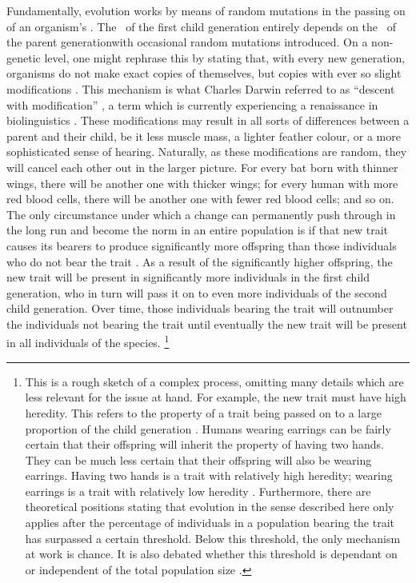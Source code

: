 Fundamentally, evolution works by means of random mutations in the passing on of an organism's \dna.
The \dna\ of the first child generation entirely depends on the \dna\ of the parent generation\dash with occasional random mutations introduced.
On a non-genetic level, one might rephrase this by stating that, with every new generation, organisms do not make exact copies of themselves, but copies with ever so slight modifications \citep[]{dediu_introduction_2015}.
This mechanism is what Charles Darwin referred to as ``descent with modification'' \citep[]{darwin_origin_1958}, a term which is currently experiencing a renaissance in biolinguistics \citep[e.g.][]{boeckx_conjecture_2017}.
These modifications may result in all sorts of differences between a parent and their child, be it less muscle mass, a lighter feather colour, or a more sophisticated sense of hearing.
Naturally, as these modifications are random, they will cancel each other out in the larger picture.
For every bat born with thinner wings, there will be another one with thicker wings; for every human with more red blood cells, there will be another one with fewer red blood cells; and so on.
The only circumstance under which a change can permanently push through in the long run and become the norm in an entire population is if that new trait causes its bearers to produce significantly more offspring than those individuals who do not bear the trait \citep[]{dediu_introduction_2015}.
As a result of the significantly higher offspring, the new trait will be present in significantly more individuals in the first child generation, who in turn will pass it on to even more individuals of the second child generation.
Over time, those individuals bearing the trait will outnumber the individuals not bearing the trait until eventually the new trait will be present in all individuals of the species.%
\footnote{This is a rough sketch of a complex process, omitting many details which are less relevant for the issue at hand.
For example, the new trait must have high heredity. This refers to the property of a trait being passed on to a large proportion of the child generation \citep{king_heredity_2013}.
Humans wearing earrings can be fairly certain that their offspring will inherit the property of having two hands.
They can be much less certain that their offspring will also be wearing earrings.
Having two hands is a trait with relatively high heredity; wearing earrings is a trait with relatively low heredity \citep[]{sapolsky_behave_2017}.
Furthermore, there are theoretical positions stating that evolution in the sense described here only applies after the percentage of individuals in a population bearing the trait has surpassed a certain threshold.
Below this threshold, the only mechanism at work is chance.
It is also debated whether this threshold is dependant on or independent of the total population size \citep[,]{berwick_why_2016,gillespie_population_2010}.}
